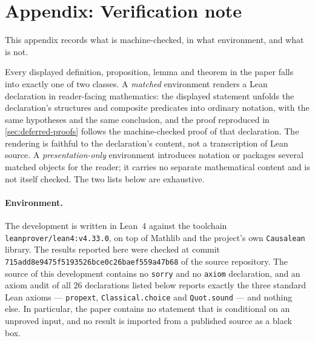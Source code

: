 \section{Appendix: Verification note}\label{sec:verification}

This appendix records what is machine-checked, in what environment, and what is not.

Every displayed definition, proposition, lemma and theorem in the paper falls into exactly one of two classes. A \emph{matched} environment renders a Lean declaration in reader-facing mathematics: the displayed statement unfolds the declaration's structures and composite predicates into ordinary notation, with the same hypotheses and the same conclusion, and the proof reproduced in \cref{sec:deferred-proofs} follows the machine-checked proof of that declaration. The rendering is faithful to the declaration's content, not a transcription of Lean source. A \emph{presentation-only} environment introduces notation or packages several matched objects for the reader; it carries no separate mathematical content and is not itself checked. The two lists below are exhaustive.

\paragraph{Environment.} The development is written in Lean~4 against the toolchain \texttt{leanprover/lean4:v4.33.0}, on top of Mathlib and the project's own \texttt{Causalean} library. The results reported here were checked at commit \texttt{715add8e9475f5193526bce0c26baef559a47b68} of the source repository. The source of this development contains no \texttt{sorry} and no \texttt{axiom} declaration, and an axiom audit of all \(26\) declarations listed below reports exactly the three standard Lean axioms --- \texttt{propext}, \texttt{Classical.choice} and \texttt{Quot.sound} --- and nothing else. In particular, the paper contains no statement that is conditional on an unproved input, and no result is imported from a published source as a black box.

